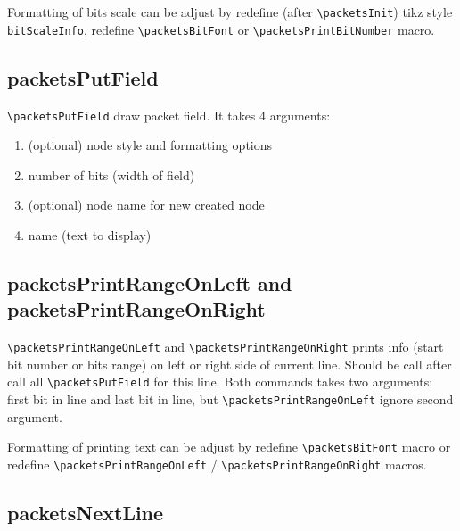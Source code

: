 \documentclass[a4paper]{article}
\begin{document}
Formatting of bits scale can be adjust by redefine (after \Verb$\packetsInit$) tikz style \Verb$bitScaleInfo$, redefine \Verb$\packetsBitFont$ or \Verb$\packetsPrintBitNumber$ macro.

\subsection{packetsPutField}

\Verb$\packetsPutField$ draw packet field. It takes 4 arguments:
\begin{enumerate}
    \item (optional) node style and formatting options
    \item number of bits (width of field)
    \item (optional) node name for new created node
    \item name (text to display)
\end{enumerate}

\subsection{packetsPrintRangeOnLeft and packetsPrintRangeOnRight}

\Verb$\packetsPrintRangeOnLeft$ and \Verb$\packetsPrintRangeOnRight$ prints info (start bit number or bits range) on left or right side of current line.
Should be call after call all \Verb$\packetsPutField$ for this line. Both commands takes two arguments: first bit in line and last bit in line,
but \Verb$\packetsPrintRangeOnLeft$ ignore second argument.

Formatting of printing text can be adjust by redefine \Verb$\packetsBitFont$ macro or redefine \Verb$\packetsPrintRangeOnLeft$ / \Verb$\packetsPrintRangeOnRight$ macros.

\begin{CenterExample}
\end{CenterExample}

\subsection{packetsNextLine}
\end{document}
